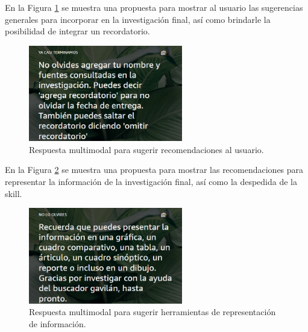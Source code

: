 En la Figura \ref{fig:56} se muestra una propuesta para mostrar al usuario las sugerencias generales para incorporar en la investigación final, así como brindarle la posibilidad de integrar un recordatorio.

\begin{figure}[H]
  \centering
  \includegraphics[width=0.60\textwidth]{Cap5/Figuras/Multimodal5.png}
  \caption{Respuesta multimodal para sugerir recomendaciones al usuario.}
  \label{fig:56}
\end{figure}

En la Figura \ref{fig:57} se muestra una propuesta para mostrar las recomendaciones para representar la información de la investigación final, así como la despedida de la skill.

\begin{figure}[H]
  \centering
  \includegraphics[width=0.60\textwidth]{Cap5/Figuras/Multimodal6.png}
  \caption{Respuesta multimodal para sugerir herramientas de representación de información.}
  \label{fig:57}
\end{figure}
